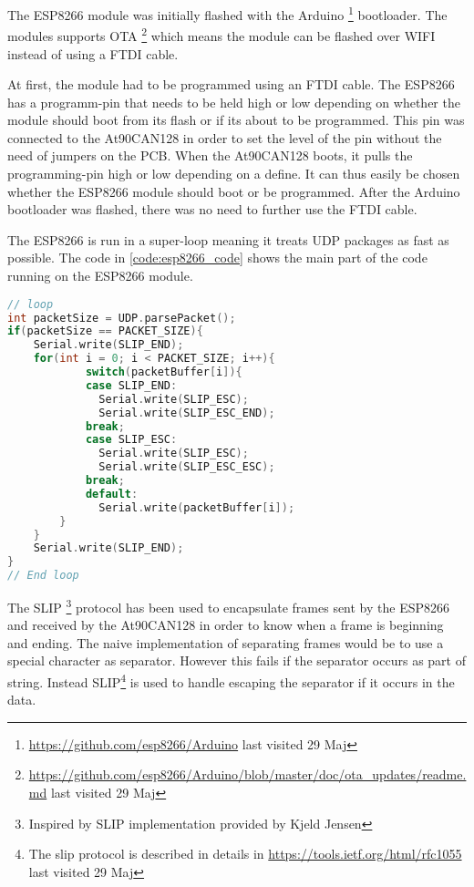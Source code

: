 The ESP8266 module was initially flashed with the Arduino \footnote{\url{https://github.com/esp8266/Arduino} last visited 29 Maj} bootloader.
The modules supports \ac{OTA} \footnote{\url{https://github.com/esp8266/Arduino/blob/master/doc/ota\_updates/readme.md} last visited 29 Maj} which means the module can be flashed over WIFI instead of using a \ac{FTDI} cable.

At first, the module had to be programmed using an \ac{FTDI} cable.
The ESP8266 has a programm-pin that needs to be held high or low depending on whether the module should boot from its flash or if its about to be programmed.
This pin was connected to the At90CAN128 in order to set the level of the pin without the need of jumpers on the \ac{PCB}. When the At90CAN128 boots, it pulls the programming-pin high or low depending on a define.
It can thus easily be chosen whether the ESP8266 module should boot or be programmed.
After the Arduino bootloader was flashed, there was no need to further use the \ac{FTDI} cable.

The ESP8266 is run in a super-loop meaning it treats UDP packages as fast as possible. The code in \ref{code:esp8266_code} shows the main part of the code running on the ESP8266 module.

\begin{lstlisting}[language = C++, caption = Snippet from loop() shows how it processes frames. When a UDP packet is available\, its size is compared with the expected size of a fame. It then loops through each byte received and runs the SLIP encapsulation, label=code:esp8266_code]
// loop
int packetSize = UDP.parsePacket();    
if(packetSize == PACKET_SIZE){
   	Serial.write(SLIP_END);
    for(int i = 0; i < PACKET_SIZE; i++){
    		switch(packetBuffer[i]){
       		case SLIP_END:
       	      Serial.write(SLIP_ESC);
       	      Serial.write(SLIP_ESC_END);
       	    break;         
       	    case SLIP_ESC:
       	      Serial.write(SLIP_ESC);
       	      Serial.write(SLIP_ESC_ESC);
       	    break;
       	    default:
       	      Serial.write(packetBuffer[i]);
		}
	}
	Serial.write(SLIP_END);
}
// End loop
\end{lstlisting}

The \ac{SLIP} \footnote{Inspired by SLIP implementation provided by Kjeld Jensen} protocol has been used to encapsulate frames sent by the ESP8266 and received by the At90CAN128 in order to know when a frame is beginning and ending. 
The naive implementation of separating frames would be to use a special character as separator. However this fails if the separator occurs as part of string. Instead \ac{SLIP}\footnote{The slip protocol is described in details in \url{https://tools.ietf.org/html/rfc1055} last visited 29 Maj} is used to handle escaping the separator if it occurs in the data.
